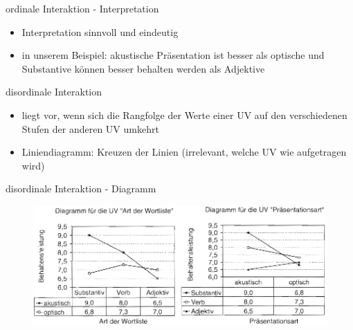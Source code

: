 \documentclass{beamer}
\begin{document}
	\begin{frame}{ordinale Interaktion - Interpretation}
		\begin{itemize}
			\item Interpretation sinnvoll und eindeutig
			\item in unserem Beispiel: akustische Präsentation ist besser als optische und Substantive können besser behalten werden als Adjektive
		\end{itemize}
	\end{frame}
	
	\begin{frame}{disordinale Interaktion}
		\begin{itemize}
			\item liegt vor, wenn sich die Rangfolge der Werte einer UV auf den verschiedenen Stufen der anderen UV umkehrt
			\item Liniendiagramm: Kreuzen der Linien (irrelevant, welche UV wie aufgetragen wird)
		\end{itemize}
	\end{frame}
	
	\begin{frame}{disordinale Interaktion - Diagramm}
		\begin{figure}
			\centering
			\includegraphics[width=1.0\textwidth]{Bilder/disordinaleI.png}
		\end{figure}
	\end{frame}
	
\end{document}
